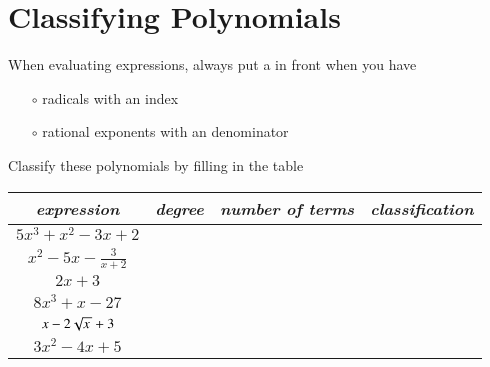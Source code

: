 \section{Classifying Polynomials}


\begin{myCenteredBox}[width=5.25in,colback=white,]
    When evaluating expressions, 
    always put a \gap{$\pm$} in front when you have
    \begin{itemize}[nosep]
        \item[$\circ$] radicals with an  index
        \item[$\circ$] rational exponents with an  denominator
    \end{itemize}
\end{myCenteredBox}


\begin{myProblemsWithContent}{1}{Classify these polynomials by filling in the table}
    \begin{tcolorbox}
    \begin{center}
    \large
    \begin{tabular}{c||c|c|c}
        {\itshape expression} & {\itshape degree} & {\itshape number of terms} & {\itshape classification} \\
        \midrule
        $5x^3 + x^2 - 3x + 2$          
            & \hspace{2em} & \hspace{2em}  & \hspace{2in} \\ \midrule
        $x^2 - 5x - {\frac{3}{x+2}}$ 
            & \hspace{2em} & \hspace{2em}  & \hspace{2in} \\ \midrule
        $2x + 3$ 
            & \hspace{2em} & \hspace{2em}  & \hspace{2in} \\ \midrule
        $8x^3 + x - 27$ 
            & \hspace{2em} & \hspace{2em}  & \hspace{2in} \\
            $x - 2\myRoot{x} + 3$ 
            & \hspace{2em} & \hspace{2em}  & \hspace{2in} \\
        $3x^2 - 4x + 5$ 
            & \hspace{2em} & \hspace{2em}  & \hspace{2in} \\
    \end{tabular}
    \end{center}
    \end{tcolorbox}
\end{myProblemsWithContent}
